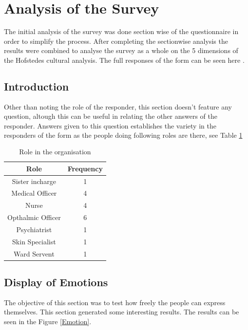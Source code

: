 \documentclass{article}
\begin{document}
\section{Analysis of the Survey}

The initial analysis of the survey was done section wise of the questionnaire in order to simplify the process. After completing the sectionwise analysis the results were combined to analyse the survey as a whole on the 5 dimensions of the Hofstedes cultural analysis. The full responses of the form can be seen here \cite{ref:Survey Results}.

\subsection{Introduction}

Other than noting the role of the responder, this section doesn't feature any question, altough this can be useful in relating the other answers of the responder. Answers given to this question establishes the variety in the responders of the form as the people doing following roles are there, see Table \ref{responder}

\begin{table}[H]
    \begin{center}
        \begin{tabular}{|c|c|}
            \hline
            Role & Frequency\\
            \hline
            Sister incharge & 1\\
            Medical Officer & 4\\
            Nurse & 4\\
            Opthalmic Officer & 6\\
            Psychiatrist & 1\\
            Skin Specialist & 1\\
            Ward Servent & 1\\
            \hline
        \end{tabular}
        \caption{Role in the organisation}
        \label{responder}
    \end{center}
\end{table}

\subsection{Display of Emotions}

The objective of this section was to test how freely the people can express themselves. This section generated some interesting results. The results can be seen in the Figure \ref{Emotion}.
\end{document}
